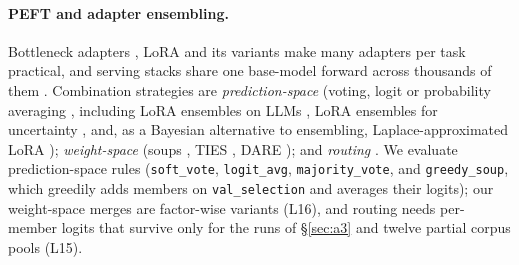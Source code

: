 \documentclass[11pt]{article}
\begin{document}
\paragraph{PEFT and adapter ensembling.} Bottleneck adapters \citep{houlsby2019parameter,pfeiffer2020adapterhub}, LoRA \citep{hu2021lora} and its variants \citep{dora,pissa,adalora,vera} make many adapters per task practical, and serving stacks share one base-model forward across thousands of them \citep{sheng2024slora,chen2024punica}. Combination strategies are \emph{prediction-space} (voting, logit or probability averaging \citep{lakshminarayanan2017simple}, including LoRA ensembles on LLMs \citep{wang2023loraensembles}, LoRA ensembles for uncertainty \citep{balabanov2024uncertainty,muhlematter2024loraensemble}, and, as a Bayesian alternative to ensembling, Laplace-approximated LoRA \citep{yang2024bayesian}); \emph{weight-space} (soups \citep{wortsman2022model}, TIES \citep{yadav2023ties}, DARE \citep{yu2024dare}); and \emph{routing} \citep{pfeiffer2021adapterfusion,huang2023lorahub,adamix,mole,molora,hydralora,multilora}. We evaluate prediction-space rules (\texttt{soft\_vote}, \texttt{logit\_avg}, \texttt{majority\_vote}, and \texttt{greedy\_soup}, which greedily adds members on \texttt{val\_selection} and averages their logits); our weight-space merges are factor-wise variants (L16), and routing needs per-member logits that survive only for the runs of \S\ref{sec:a3} and twelve partial corpus pools (L15).
\end{document}
